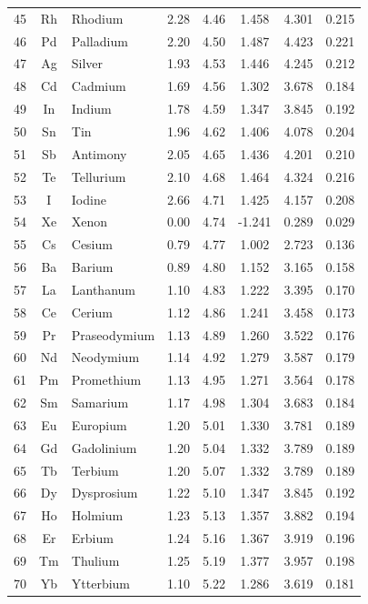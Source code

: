 \documentclass[12pt,a4paper]{article}
\theoremstyle{remark}
\begin{document}
\begin{longtable}{|c|c|p{2.5cm}|c|c|c|c|c|}
		45 & Rh & Rhodium & 2.28 & 4.46 & 1.458 & 4.301 & 0.215 \\
		46 & Pd & Palladium & 2.20 & 4.50 & 1.487 & 4.423 & 0.221 \\
		47 & Ag & Silver & 1.93 & 4.53 & 1.446 & 4.245 & 0.212 \\
		48 & Cd & Cadmium & 1.69 & 4.56 & 1.302 & 3.678 & 0.184 \\
		49 & In & Indium & 1.78 & 4.59 & 1.347 & 3.845 & 0.192 \\
		50 & Sn & Tin & 1.96 & 4.62 & 1.406 & 4.078 & 0.204 \\
		51 & Sb & Antimony & 2.05 & 4.65 & 1.436 & 4.201 & 0.210 \\
		52 & Te & Tellurium & 2.10 & 4.68 & 1.464 & 4.324 & 0.216 \\
		53 & I & Iodine & 2.66 & 4.71 & 1.425 & 4.157 & 0.208 \\
		54 & Xe & Xenon & 0.00 & 4.74 & -1.241 & 0.289 & 0.029 \\
		55 & Cs & Cesium & 0.79 & 4.77 & 1.002 & 2.723 & 0.136 \\
		56 & Ba & Barium & 0.89 & 4.80 & 1.152 & 3.165 & 0.158 \\
		57 & La & Lanthanum & 1.10 & 4.83 & 1.222 & 3.395 & 0.170 \\
		58 & Ce & Cerium & 1.12 & 4.86 & 1.241 & 3.458 & 0.173 \\
		59 & Pr & Praseodymium & 1.13 & 4.89 & 1.260 & 3.522 & 0.176 \\
		60 & Nd & Neodymium & 1.14 & 4.92 & 1.279 & 3.587 & 0.179 \\
		61 & Pm & Promethium & 1.13 & 4.95 & 1.271 & 3.564 & 0.178 \\
		62 & Sm & Samarium & 1.17 & 4.98 & 1.304 & 3.683 & 0.184 \\
		63 & Eu & Europium & 1.20 & 5.01 & 1.330 & 3.781 & 0.189 \\
		64 & Gd & Gadolinium & 1.20 & 5.04 & 1.332 & 3.789 & 0.189 \\
		65 & Tb & Terbium & 1.20 & 5.07 & 1.332 & 3.789 & 0.189 \\
		66 & Dy & Dysprosium & 1.22 & 5.10 & 1.347 & 3.845 & 0.192 \\
		67 & Ho & Holmium & 1.23 & 5.13 & 1.357 & 3.882 & 0.194 \\
		68 & Er & Erbium & 1.24 & 5.16 & 1.367 & 3.919 & 0.196 \\
		69 & Tm & Thulium & 1.25 & 5.19 & 1.377 & 3.957 & 0.198 \\
		70 & Yb & Ytterbium & 1.10 & 5.22 & 1.286 & 3.619 & 0.181 \\

\end{longtable}
\end{document}
